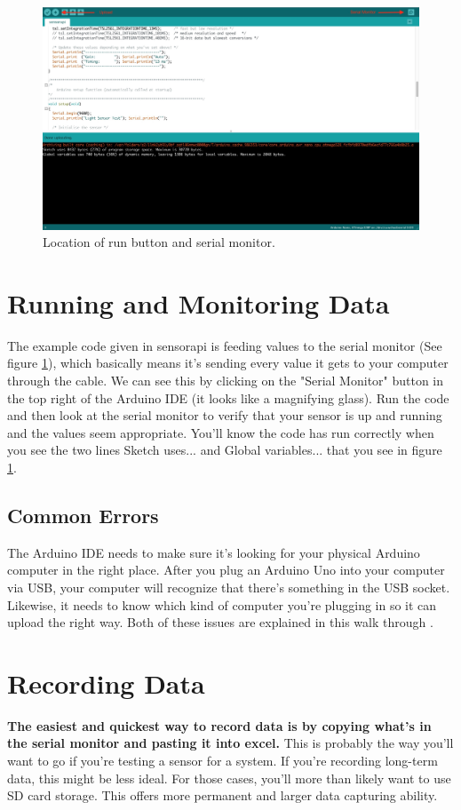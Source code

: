 \documentclass[a4paper]{article}
\begin{document}
\begin{figure}
\centering
\includegraphics[width=1\textwidth]{run_serial.jpg}
\caption{\label{fig:run_serial}Location of run button and serial monitor.}
\end{figure}

\section{Running and Monitoring Data}
The example code given in sensorapi is feeding values to the serial monitor (See figure \ref{fig:run_serial}), which basically means it's sending every value it gets to your computer through the cable. We can see this by clicking on the "Serial Monitor" button in the top right of the Arduino IDE (it looks like a magnifying glass). Run the code and then look at the serial monitor to verify that your sensor is up and running and the values seem appropriate. You'll know the code has run correctly when you see the two lines 
Sketch uses... and Global variables... that you see in figure \ref{fig:run_serial}.

\subsection{Common Errors}
The Arduino IDE needs to make sure it's looking for your physical Arduino computer in the right place. After you plug an Arduino Uno into your computer via USB, your computer will recognize that there's something in the USB socket. Likewise, it needs to know which kind of computer you're plugging in so it can upload the right way. Both of these issues are explained in this walk through \cite{arduino_error_walkthrough}.

\section{Recording Data}
\textbf{The easiest and quickest way to record data is by copying what's in the serial monitor and pasting it into excel.} This is probably the way you'll want to go if you're testing a sensor for a system. If you're recording long-term data, this might be less ideal. For those cases, you'll more than likely want to use SD card storage. This offers more permanent and larger data capturing ability.
\end{document}
